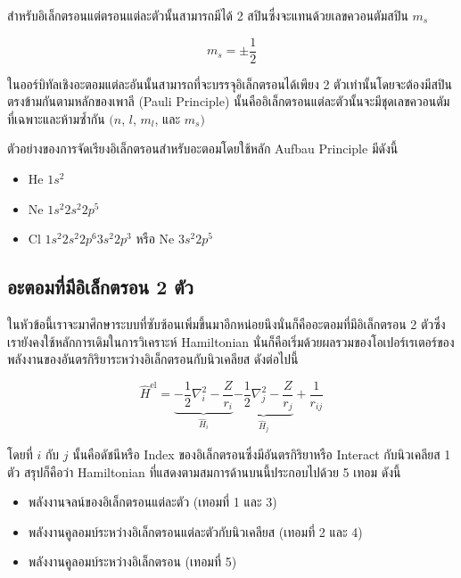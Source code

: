 \noindent สำหรับอิเล็กตรอนแต่ตรอนแต่ละตัวนั้นสามารถมีได้ 2 สปินซึ่งจะแทนด้วยเลขควอนตัมสปิน $m_{s}$

\begin{equation}
  m_{s} = \pm \frac{1}{2}
\end{equation}

ในออร์บิทัลเชิงอะตอมแต่ละอันนั้นสามารถที่จะบรรจุอิเล็กตรอนได้เพียง 2 ตัวเท่านั้นโดยจะต้องมีสปินตรงข้ามกันตามหลักของเพาลี (Pauli Principle)
นั้นคืออิเล็กตรอนแต่ละตัวนั้นจะมีชุดเลขควอนตัมที่เฉพาะและห้ามซ้ำกัน $(n$, $l$, $m_{l}$, และ $m_{s})$

ตัวอย่างของการจัดเรียงอิเล็กตรอนสำหรับอะตอมโดยใช้หลัก Aufbau Principle มีดังนี้

\begin{itemize}[topsep=0pt,noitemsep]
  \setlength\itemsep{1em}
  \item He $1s^{2}$

  \item Ne $1s^{2} 2s^{2} 2p^{5}$

  \item Cl $1s^{2} 2s^{2} 2p^{6} 3s^{2} 2p^{3}$ หรือ Ne $3s^{2} 2p^{5}$
\end{itemize}

\subsection{อะตอมที่มีอิเล็กตรอน 2 ตัว}

ในหัวข้อนี้เราจะมาศึกษาระบบที่ซับซ้อนเพิ่มขึ้นมาอีกหน่อยนึงนั่นก็คืออะตอมที่มีอิเล็กตรอน 2 ตัวซึ่งเรายังคงใช้หลักการเดิมในการวิเคราะห์ Hamiltonian
นั่นก็คือเริ่มด้วยผลรวมของโอเปอร์เรเตอร์ของพลังงานของอันตรกิริยาระหว่างอิเล็กตรอนกับนิวเคลียส ดังต่อไปนี้

\begin{equation}
  \hat{H}^{\text{el}}
  =
  \underbrace
  {
    -\frac{1}{2} \nabla^{2}_{i}
    -\frac{Z}{r_{i}}
  }_
  {
    \hat{H}_{i}
  }
  \underbrace
  {
    -\frac{1}{2} \nabla^{2}_{j}
    -\frac{Z}{r_{j}}
  }_
  {
    \hat{H}_{j}
  }
  + \frac{1}{r_{ij}}
\end{equation}

\noindent โดยที่ $i$ กับ $j$ นั้นคือดัชนีหรือ Index ของอิเล็กตรอนซึ่งมีอันตรกิริยาหรือ Interact กับนิวเคลียส 1 ตัว สรุปก็คือว่า
Hamiltonian ที่แสดงตามสมการด้านบนนี้ประกอบไปด้วย 5 เทอม ดังนี้

\begin{itemize}[topsep=0pt,noitemsep]
  \setlength\itemsep{1em}
  \item พลังงานจลน์ของอิเล็กตรอนแต่ละตัว (เทอมที่ 1 และ 3)

  \item พลังงานคูลอมบ์ระหว่างอิเล็กตรอนแต่ละตัวกับนิวเคลียส (เทอมที่ 2 และ 4)

  \item พลังงานคูลอมบ์ระหว่างอิเล็กตรอน (เทอมที่ 5)
\end{itemize}

